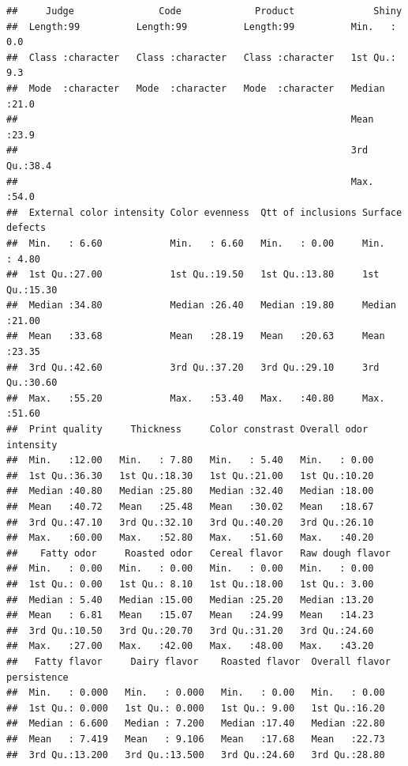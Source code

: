 \documentclass[
]{book}
\begin{document}
\begin{verbatim}
##     Judge               Code             Product              Shiny     
##  Length:99          Length:99          Length:99          Min.   : 0.0  
##  Class :character   Class :character   Class :character   1st Qu.: 9.3  
##  Mode  :character   Mode  :character   Mode  :character   Median :21.0  
##                                                           Mean   :23.9  
##                                                           3rd Qu.:38.4  
##                                                           Max.   :54.0  
##  External color intensity Color evenness  Qtt of inclusions Surface defects
##  Min.   : 6.60            Min.   : 6.60   Min.   : 0.00     Min.   : 4.80  
##  1st Qu.:27.00            1st Qu.:19.50   1st Qu.:13.80     1st Qu.:15.30  
##  Median :34.80            Median :26.40   Median :19.80     Median :21.00  
##  Mean   :33.68            Mean   :28.19   Mean   :20.63     Mean   :23.35  
##  3rd Qu.:42.60            3rd Qu.:37.20   3rd Qu.:29.10     3rd Qu.:30.60  
##  Max.   :55.20            Max.   :53.40   Max.   :40.80     Max.   :51.60  
##  Print quality     Thickness     Color constrast Overall odor intensity
##  Min.   :12.00   Min.   : 7.80   Min.   : 5.40   Min.   : 0.00         
##  1st Qu.:36.30   1st Qu.:18.30   1st Qu.:21.00   1st Qu.:10.20         
##  Median :40.80   Median :25.80   Median :32.40   Median :18.00         
##  Mean   :40.72   Mean   :25.48   Mean   :30.02   Mean   :18.67         
##  3rd Qu.:47.10   3rd Qu.:32.10   3rd Qu.:40.20   3rd Qu.:26.10         
##  Max.   :60.00   Max.   :52.80   Max.   :51.60   Max.   :40.20         
##    Fatty odor     Roasted odor   Cereal flavor   Raw dough flavor
##  Min.   : 0.00   Min.   : 0.00   Min.   : 0.00   Min.   : 0.00   
##  1st Qu.: 0.00   1st Qu.: 8.10   1st Qu.:18.00   1st Qu.: 3.00   
##  Median : 5.40   Median :15.00   Median :25.20   Median :13.20   
##  Mean   : 6.81   Mean   :15.07   Mean   :24.99   Mean   :14.23   
##  3rd Qu.:10.50   3rd Qu.:20.70   3rd Qu.:31.20   3rd Qu.:24.60   
##  Max.   :27.00   Max.   :42.00   Max.   :48.00   Max.   :43.20   
##   Fatty flavor     Dairy flavor    Roasted flavor  Overall flavor persistence
##  Min.   : 0.000   Min.   : 0.000   Min.   : 0.00   Min.   : 0.00             
##  1st Qu.: 0.000   1st Qu.: 0.000   1st Qu.: 9.00   1st Qu.:16.20             
##  Median : 6.600   Median : 7.200   Median :17.40   Median :22.80             
##  Mean   : 7.419   Mean   : 9.106   Mean   :17.68   Mean   :22.73             
##  3rd Qu.:13.200   3rd Qu.:13.500   3rd Qu.:24.60   3rd Qu.:28.80             

\end{verbatim}
\end{document}
